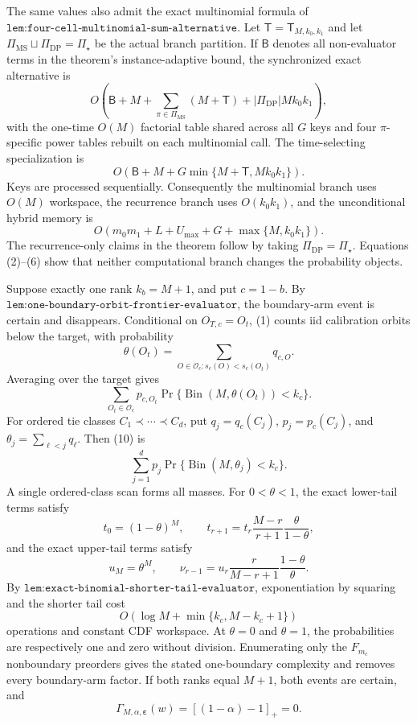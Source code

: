 The same values also admit the exact multinomial formula of \(\texttt{lem:four-cell-multinomial-sum-alternative}\).  Let \(\mathsf T=\mathsf T_{M,k_0,k_1}\) and let \(\Pi_{\mathrm{MS}}\sqcup\Pi_{\mathrm{DP}}=\Pi_\star\) be the actual branch partition.  If \(\mathsf B\) denotes all non-evaluator terms in the theorem's instance-adaptive bound, the synchronized exact alternative is
\[
O\!\left(
\mathsf B+M+\sum_{\pi\in\Pi_{\mathrm{MS}}}(M+\mathsf T)
+|\Pi_{\mathrm{DP}}|Mk_0k_1
\right), \tag{7}
\]
with the one-time \(O(M)\) factorial table shared across all \(G\) keys and four \(\pi\)-specific power tables rebuilt on each multinomial call.  The time-selecting specialization is
\[
O\!\left(\mathsf B+M+G\min\{M+\mathsf T,Mk_0k_1\}\right). \tag{8}
\]
Keys are processed sequentially.  Consequently the multinomial branch uses \(O(M)\) workspace, the recurrence branch uses \(O(k_0k_1)\), and the unconditional hybrid memory is
\[
O\!\left(m_0m_1+L+U_{\max}+G+\max\{M,k_0k_1\}\right). \tag{9}
\]
The recurrence-only claims in the theorem follow by taking \(\Pi_{\mathrm{DP}}=\Pi_\star\).  Equations (2)--(6) show that neither computational branch changes the probability objects.

Suppose exactly one rank \(k_b=M+1\), and put \(c=1-b\).  By \(\texttt{lem:one-boundary-orbit-frontier-evaluator}\), the boundary-arm event is certain and disappears.  Conditional on \(O_{T,c}=O_t\), (1) counts iid calibration orbits below the target, with probability
\[
\theta(O_t)=\sum_{O\in\mathcal O_c:s_c(O)<s_c(O_t)}q_{c,O}.
\]
Averaging over the target gives
\[
\sum_{O_t\in\mathcal O_c}p_{c,O_t}
\Pr\{\operatorname{Bin}(M,\theta(O_t))<k_c\}. \tag{10}
\]
For ordered tie classes \(C_1\prec\cdots\prec C_d\), put \(q_j=q_c(C_j)\), \(p_j=p_c(C_j)\), and \(\theta_j=\sum_{\ell<j}q_\ell\).  Then (10) is
\[
\sum_{j=1}^d p_j\Pr\{\operatorname{Bin}(M,\theta_j)<k_c\}. \tag{11}
\]
A single ordered-class scan forms all masses.  For \(0<\theta<1\), the exact lower-tail terms satisfy
\[
t_0=(1-\theta)^M,\qquad
t_{r+1}=t_r\frac{M-r}{r+1}\frac{\theta}{1-\theta}, \tag{12}
\]
and the exact upper-tail terms satisfy
\[
u_M=\theta^M,\qquad\nu_{r-1}=u_r\frac{r}{M-r+1}\frac{1-\theta}{\theta}. \tag{13}
\]
By \(\texttt{lem:exact-binomial-shorter-tail-evaluator}\), exponentiation by squaring and the shorter tail cost
\[
O(\log M+\min\{k_c,M-k_c+1\})
\]
operations and constant CDF workspace.  At \(\theta=0\) and \(\theta=1\), the probabilities are respectively one and zero without division.  Enumerating only the \(F_{m_c}\) nonboundary preorders gives the stated one-boundary complexity and removes every boundary-arm factor.  If both ranks equal \(M+1\), both events are certain, and
\[
\Gamma_{M,\alpha,\boldsymbol\varepsilon}(w)=[(1-\alpha)-1]_+=0. \tag{14}
\]

